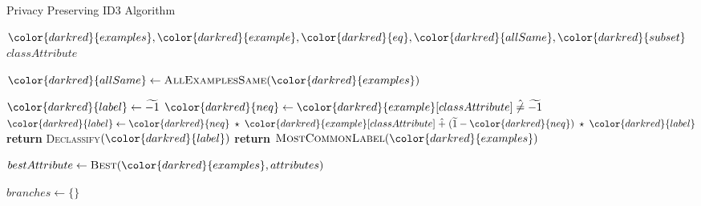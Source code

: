 \begin{algorithm}[H]
\caption{Privacy Preserving ID3 Algorithm}\label{a:id3-pp}
\begin{algorithmic}[1]
\renewcommand{\algorithmicrequire}{\textbf{Private Vars:}}
\Require ${\color{darkred}{examples}}, {\color{darkred}{example}}, {\color{darkred}{eq}}, {\color{darkred}{allSame}}, {\color{darkred}{subset}}$
\renewcommand{\algorithmicrequire}{\textbf{Global Vars:}}
\Require $classAttribute$

    \State ${\color{darkred}{allSame}} \gets \textsc{AllExamplesSame}({\color{darkred}{examples}})$

        \State ${\color{darkred}{label}} \gets \enc{-1}$
        \For{${\color{darkred}{example}} \in {\color{darkred}{examples}}$}
            \State ${\color{darkred}{neq}} \gets {\color{darkred}{example}}[classAttribute] \hneq \enc{-1}$
            \State ${\color{darkred}{label}} \gets {\color{darkred}{neq}} \hmul {\color{darkred}{example}}[classAttribute] \hplus (\enc{1} - {\color{darkred}{neq}}) \hmul {\color{darkred}{label}} $
        \EndFor
        \State \textbf{return} \textsc{Declassify}$({\color{darkred}{label}})$
        \State \textbf{return} $\textsc{MostCommonLabel}({\color{darkred}{examples}})$
    \EndIf

    \State $bestAttribute \gets \textsc{Best}({\color{darkred}{examples}}, attributes)$


    \State $branches \gets \{\}$


\end{algorithmic}
\end{algorithm}
